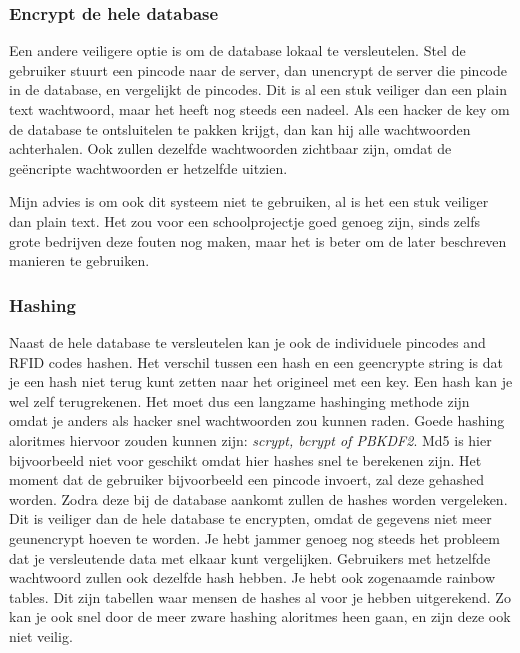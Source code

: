 \documentclass{article}
\begin{document}
\subsubsection{Encrypt de hele database}

Een andere veiligere optie is om de database lokaal te versleutelen.
Stel de gebruiker stuurt een pincode naar de server, dan unencrypt de server die pincode in de database, en vergelijkt de pincodes.
Dit is al een stuk veiliger dan een plain text wachtwoord, maar het heeft nog steeds een nadeel.
Als een hacker de key om de database te ontsluitelen te pakken krijgt, dan kan hij alle wachtwoorden achterhalen.
Ook zullen dezelfde wachtwoorden zichtbaar zijn, omdat de ge\"encripte wachtwoorden er hetzelfde uitzien.

Mijn advies is om ook dit systeem niet te gebruiken, al is het een stuk veiliger dan plain text.
Het zou voor een schoolprojectje goed genoeg zijn, sinds zelfs grote bedrijven deze fouten nog maken, maar het is beter om de later beschreven manieren te gebruiken.

\newpage

\subsubsection{Hashing}

Naast de hele database te versleutelen kan je ook de individuele pincodes and RFID codes hashen.
Het verschil tussen een hash en een ge\:encrypte string is dat je een hash niet terug kunt zetten naar het origineel met een key. 
Een hash kan je wel zelf terugrekenen.
Het moet dus een langzame hashinging methode zijn omdat je anders als hacker snel wachtwoorden zou kunnen raden.
Goede hashing aloritmes hiervoor zouden kunnen zijn: \emph{scrypt, bcrypt of PBKDF2}.
Md5 is hier bijvoorbeeld niet voor geschikt omdat hier hashes snel te berekenen zijn.
Het moment dat de gebruiker bijvoorbeeld een pincode invoert, zal deze gehashed worden.
Zodra deze bij de database aankomt zullen de hashes worden vergeleken.
Dit is veiliger dan de hele database te encrypten, omdat de gegevens niet meer geunencrypt hoeven te worden.
Je hebt jammer genoeg nog steeds het probleem dat je versleutende data met elkaar kunt vergelijken.
Gebruikers met hetzelfde wachtwoord zullen ook dezelfde hash hebben.
Je hebt ook zogenaamde rainbow tables.
Dit zijn tabellen waar mensen de hashes al voor je hebben uitgerekend.
Zo kan je ook snel door de meer zware hashing aloritmes heen gaan, en zijn deze ook niet veilig.
\end{document}
